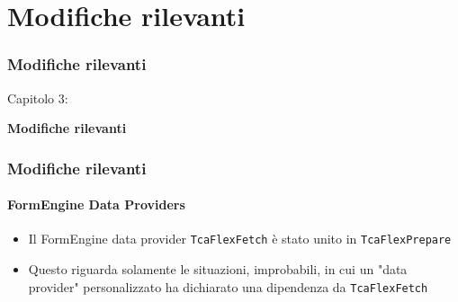 %

\section{Modifiche rilevanti}
\begin{frame}[fragile]
	\frametitle{Modifiche rilevanti}

	\begin{center}\huge{Capitolo 3:}\end{center}
	\begin{center}\huge{\color{typo3darkgrey}\textbf{Modifiche rilevanti}}\end{center}

\end{frame}


\begin{frame}[fragile]
	\frametitle{Modifiche rilevanti}
	\framesubtitle{FormEngine Data Providers}

	\begin{itemize}
		\item Il FormEngine data provider \texttt{TcaFlexFetch} è stato unito in \texttt{TcaFlexPrepare}
		\item Questo riguarda solamente le situazioni, improbabili, in cui un "data provider" 
			personalizzato ha dichiarato una dipendenza da \texttt{TcaFlexFetch}
	\end{itemize}

\end{frame}

